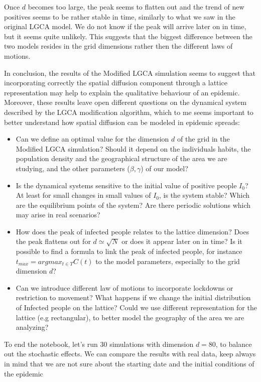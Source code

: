 \documentclass[
]{article}
\begin{document}
Once \(d\) becomes too large, the peak seems to flatten out and the
trend of new positives seems to be rather stable in time, similarly to
what we saw in the original LGCA model. We do not know if the peak will
arrive later on in time, but it seems quite unlikely. This suggests that
the biggest difference between the two models resides in the grid
dimensions rather then the different laws of motions.

In conclusion, the results of the Modified LGCA simulation seems to
suggest that incorporating correctly the spatial diffusion component
through a lattice representation may help to explain the qualitative
behaviour of an epidemic. Moreover, these results leave open different
questions on the dynamical system described by the LGCA modification
algorithm, which to me seems important to better understand how spatial
diffusion can be modeled in epidemic spreads:

\begin{itemize}
\item
  Can we define an optimal value for the dimension \(d\) of the grid in
  the Modified LGCA simulation? Should it depend on the individuals
  habits, the population density and the geographical structure of the
  area we are studying, and the other parameters (\(\beta,\gamma\)) of
  our model?
\item
  Is the dynamical systems sensitive to the initial value of positive
  people \(I_0\)? At least for small changes in small values of \(I_0\),
  is the system stable? Which are the equilibrium points of the system?
  Are there periodic solutions which may arise in real scenarios?
\item
  How does the peak of infected people relates to the lattice dimension?
  Does the peak flattens out for \(d \simeq \sqrt{N}\) or does it appear
  later on in time? Is it possible to find a formula to link the peak of
  infected people, for instance \(t_{max}=argmax_{t \in T} C(t)\) to the
  model parameters, especially to the grid dimension \(d\)?
\item
  Can we introduce different law of motions to incorporate lockdowns or
  restriction to movement? What happens if we change the initial
  distribution of Infected people on the lattice? Could we use different
  representation for the lattice (e.g rectangular), to better model the
  geography of the area we are analyzing?
\end{itemize}

To end the notebook, let's run \(30\) simulations with dimension
\(d=80\), to balance out the stochastic effects. We can compare the
results with real data, keep always in mind that we are not sure about
the starting date and the initial conditions of the epidemic
\end{document}
